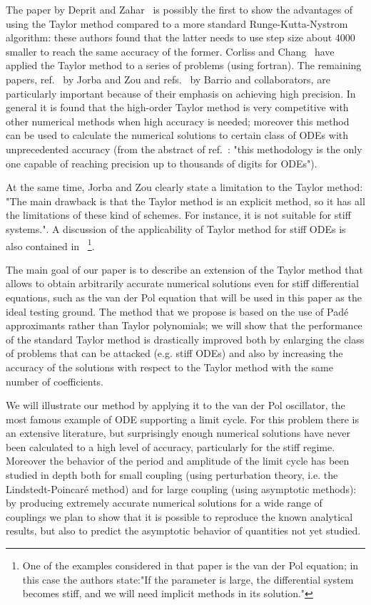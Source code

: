 \documentclass[final]{article}
\begin{document}
The paper by Deprit and Zahar~\cite{Deprit66} is possibly the first to show the advantages of using the Taylor method compared to a 
more standard Runge-Kutta-Nystrom algorithm: these authors found that the latter needs to use step size about $4000$ smaller to reach the same accuracy of the former.
Corliss and Chang~\cite{Corliss82,Chang94} have applied the Taylor method to a series of problems (using fortran). 
The remaining papers, ref.~\cite{Jorba05} by Jorba and Zou and refs.~\cite{Barrio05, Barrio05b, Barrio11, Barrio12} by Barrio and collaborators, 
are particularly important because of their emphasis on achieving high precision. In general it is found that  the high-order Taylor method is very competitive
with other numerical methods when high accuracy is needed; moreover this method can be used to calculate the numerical solutions to certain class of ODEs with unprecedented accuracy (from the abstract of ref.~\cite{Barrio11}: "this methodology is the only one capable of reaching precision up to thousands of digits for ODEs").

At the same time, Jorba and Zou clearly state a limitation to the Taylor method: "The main drawback is that
the Taylor method is an explicit method, so it has all the limitations of these kind of schemes. For instance, it is not suitable for
stiff systems.". A discussion of the applicability of Taylor method for stiff ODEs is also contained in \cite{Barrio05}~\footnote{One of the examples considered in that paper is the van der Pol equation; in this case the authors state:"If the parameter is large, the differential system becomes stiff, and we will need implicit methods
in its solution." }.

The main goal of our paper is to describe an extension of the Taylor method that allows to obtain arbitrarily accurate numerical solutions even for stiff differential equations, such as the van der Pol equation that will be used in this paper as the ideal testing ground. The method that we propose is based on the use of Pad\'e approximants rather than Taylor polynomials; we will show that the performance of the standard Taylor method is drastically improved both by enlarging the class of problems that can be attacked (e.g. stiff ODEs) and also by increasing the accuracy of the solutions with respect to  the Taylor method with the same number of coefficients.

We will illustrate our method by applying it to the van der Pol oscillator, the most famous example of ODE supporting a limit cycle. 
For this problem there is an extensive literature, but surprisingly enough numerical solutions have never been calculated to 
a high level of accuracy, particularly for the stiff regime. Moreover the behavior of the period and amplitude of the limit cycle has been studied in depth both for small coupling (using perturbation theory, i.e. the Lindstedt-Poincar\'e method) and for large coupling (using asymptotic methods): by producing extremely accurate numerical solutions for a wide range of couplings we plan to show that it is possible to reproduce the known analytical results, but also to  predict the asymptotic behavior of quantities not yet studied.
\end{document}
